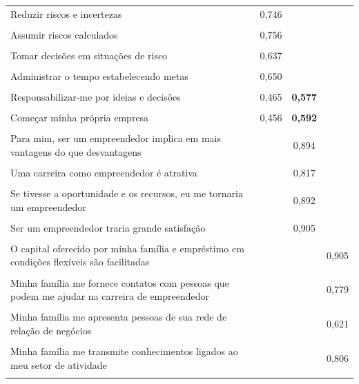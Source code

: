 \begin{center}
\begin{longtable}{p{6cm} c c c }
Reduzir riscos e incertezas
 &  0,746 & & \\\\
 
Assumir riscos calculados
 &   0,756 & & \\\\
 
 Tomar decisões em situações de risco
 &   0,637 & & \\\\
 
Administrar o tempo estabelecendo metas
 &   0,650 & & \\\\
 
Responsabilizar-me por ideias e decisões
 & 0,465
& \textbf{0,577} &  \\\\

Começar minha própria empresa
 & 0,456 & \textbf{0,592}  & \\\\
 
Para mim, ser um empreendedor implica em mais vantagens do que desvantagens
 &  & 0,894  & \\\\
 
Uma carreira como empreendedor é atrativa
 &  & 0,817  & \\\\
 
Se tivesse a oportunidade e os recursos, eu me tornaria um empreendedor
 &  & 0,892 & \\\\
 
Ser um empreendedor traria grande satisfação
 &  & 0,905 & \\\\
 
O capital oferecido por minha família e empréstimo em condições flexíveis são facilitadas
 &  & & 0,905 \\\\
 
Minha família me fornece contatos com pessoas que podem me ajudar na carreira de empreendedor
 &  & & 0,779 \\\\
 
Minha família me apresenta pessoas de sua rede de relação de negócios
 &  & & 0,621 \\\\
 
Minha família me transmite conhecimentos ligados ao meu setor de atividade
 &  & & 0,806 \\\\
 

\end{longtable}
\end{center}
